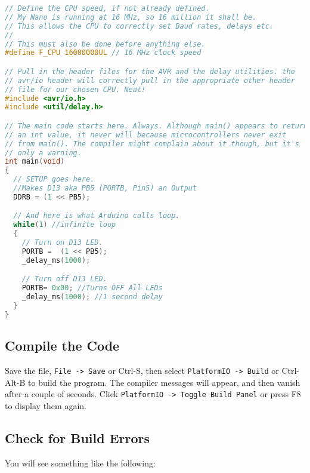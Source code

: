 \begin{lstlisting}[language=C,caption={AVRBlink.c}]
// Define the CPU speed, if not already defined.
// My Nano is running at 16 MHz, so 16 million it shall be.
// This allows the CPU to correctly set Baud rates, delays etc.
//
// This must also be done before anything else.
#define F_CPU 16000000UL // 16 MHz clock speed

// Pull in the header files for the AVR and the delay utilities. the
// avr/io header will correctly pull in the appropriate other header 
// file for our chosen CPU. Neat!
#include <avr/io.h>
#include <util/delay.h>

// The main code starts here. Always. Although main() appears to return
// an int value, it never will because microcontrollers never exit 
// from main(). The compiler might complain about it though, but it's 
// only a warning.
int main(void)
{
  // SETUP goes here.
  //Makes D13 aka PB5 (PORTB, Pin5) an Output
  DDRB = (1 << PB5); 

  // And here is what Arduino calls loop.
  while(1) //infinite loop
  {
    // Turn on D13 LED.
    PORTB =  (1 << PB5);
    _delay_ms(1000);

    // Turn off D13 LED.
    PORTB= 0x00; //Turns OFF All LEDs
    _delay_ms(1000); //1 second delay
  }
}
\end{lstlisting}

\subsection{Compile the Code}\label{compile-the-code}

Save the file, \lstinline!File -> Save! or Ctrl-S, then select
\lstinline!PlatformIO -> Build! or Ctrl-Alt-B to build the program. The
compiler messages will appear, and then vanish after a couple of
seconds. Click \lstinline!PlatformIO -> Toggle Build Panel! or press F8
to display them again.

\subsection{Check for Build Errors}\label{check-for-build-errors}

You will see something like the following:

